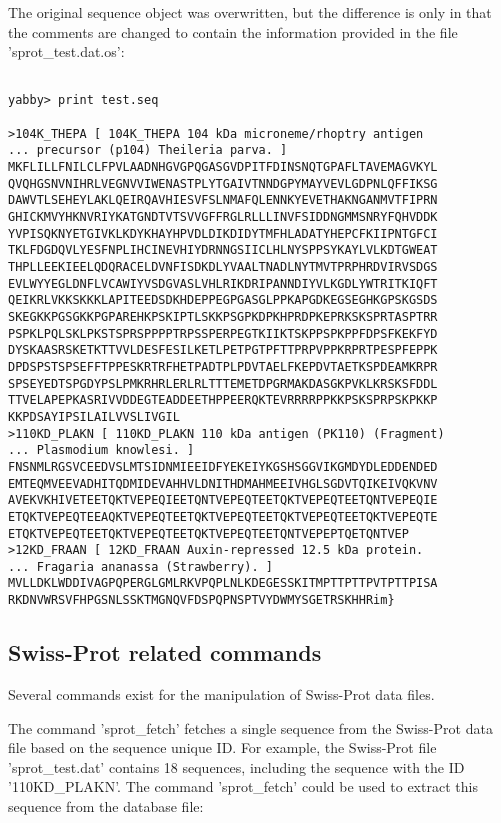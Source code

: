 The original sequence object was overwritten, but the difference
is only in that the comments are changed to contain the information
provided in the file 'sprot\_test.dat.os':

\begin{verbatim}

yabby> print test.seq

>104K_THEPA [ 104K_THEPA 104 kDa microneme/rhoptry antigen
... precursor (p104) Theileria parva. ]
MKFLILLFNILCLFPVLAADNHGVGPQGASGVDPITFDINSNQTGPAFLTAVEMAGVKYL
QVQHGSNVNIHRLVEGNVVIWENASTPLYTGAIVTNNDGPYMAYVEVLGDPNLQFFIKSG
DAWVTLSEHEYLAKLQEIRQAVHIESVFSLNMAFQLENNKYEVETHAKNGANMVTFIPRN
GHICKMVYHKNVRIYKATGNDTVTSVVGFFRGLRLLLINVFSIDDNGMMSNRYFQHVDDK
YVPISQKNYETGIVKLKDYKHAYHPVDLDIKDIDYTMFHLADATYHEPCFKIIPNTGFCI
TKLFDGDQVLYESFNPLIHCINEVHIYDRNNGSIICLHLNYSPPSYKAYLVLKDTGWEAT
THPLLEEKIEELQDQRACELDVNFISDKDLYVAALTNADLNYTMVTPRPHRDVIRVSDGS
EVLWYYEGLDNFLVCAWIYVSDGVASLVHLRIKDRIPANNDIYVLKGDLYWTRITKIQFT
QEIKRLVKKSKKKLAPITEEDSDKHDEPPEGPGASGLPPKAPGDKEGSEGHKGPSKGSDS
SKEGKKPGSGKKPGPAREHKPSKIPTLSKKPSGPKDPKHPRDPKEPRKSKSPRTASPTRR
PSPKLPQLSKLPKSTSPRSPPPPTRPSSPERPEGTKIIKTSKPPSPKPPFDPSFKEKFYD
DYSKAASRSKETKTTVVLDESFESILKETLPETPGTPFTTPRPVPPKRPRTPESPFEPPK
DPDSPSTSPSEFFTPPESKRTRFHETPADTPLPDVTAELFKEPDVTAETKSPDEAMKRPR
SPSEYEDTSPGDYPSLPMKRHRLERLRLTTTEMETDPGRMAKDASGKPVKLKRSKSFDDL
TTVELAPEPKASRIVVDDEGTEADDEETHPPEERQKTEVRRRRPPKKPSKSPRPSKPKKP
KKPDSAYIPSILAILVVSLIVGIL
>110KD_PLAKN [ 110KD_PLAKN 110 kDa antigen (PK110) (Fragment)
... Plasmodium knowlesi. ]
FNSNMLRGSVCEEDVSLMTSIDNMIEEIDFYEKEIYKGSHSGGVIKGMDYDLEDDENDED
EMTEQMVEEVADHITQDMIDEVAHHVLDNITHDMAHMEEIVHGLSGDVTQIKEIVQKVNV
AVEKVKHIVETEETQKTVEPEQIEETQNTVEPEQTEETQKTVEPEQTEETQNTVEPEQIE
ETQKTVEPEQTEEAQKTVEPEQTEETQKTVEPEQTEETQKTVEPEQTEETQKTVEPEQTE
ETQKTVEPEQTEETQKTVEPEQTEETQKTVEPEQTEETQNTVEPEPTQETQNTVEP
>12KD_FRAAN [ 12KD_FRAAN Auxin-repressed 12.5 kDa protein.
... Fragaria ananassa (Strawberry). ]
MVLLDKLWDDIVAGPQPERGLGMLRKVPQPLNLKDEGESSKITMPTTPTTPVTPTTPISA
RKDNVWRSVFHPGSNLSSKTMGNQVFDSPQPNSPTVYDWMYSGETRSKHHRim}

\end{verbatim}

\subsection{Swiss-Prot related commands}

Several commands exist for the manipulation of Swiss-Prot data files.


The command 'sprot\_fetch' fetches a single sequence from the
Swiss-Prot data file based on the sequence unique ID. For example,
the Swiss-Prot file 'sprot\_test.dat' contains 18 sequences,
including the sequence with the ID '110KD\_PLAKN'. The command
'sprot\_fetch' could be used to extract this sequence from the
database file:

